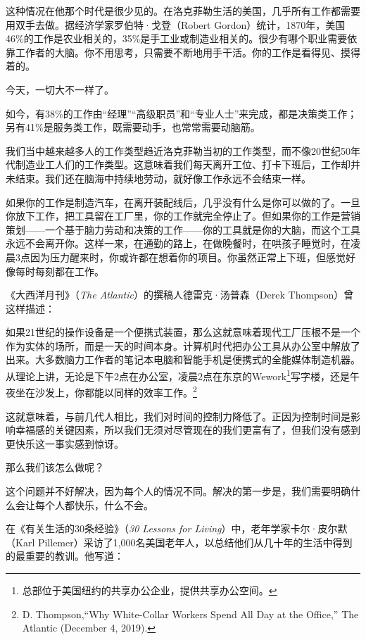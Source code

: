 这种情况在他那个时代是很少见的。在洛克菲勒生活的美国，几乎所有工作都需要用双手去做。据经济学家罗伯特·戈登（Robert Gordon）统计，1870年，美国46\%的工作是农业相关的，35\%是手工业或制造业相关的。很少有哪个职业需要依靠工作者的大脑。你不用思考，只需要不断地用手干活。你的工作是看得见、摸得着的。

今天，一切大不一样了。

如今，有38\%的工作由“经理”“高级职员”和“专业人士”来完成，都是决策类工作；另有41\%是服务类工作，既需要动手，也常常需要动脑筋。

我们当中越来越多人的工作类型趋近洛克菲勒当初的工作类型，而不像20世纪50年代制造业工人们的工作类型。这意味着我们每天离开工位、打卡下班后，工作却并未结束。我们还在脑海中持续地劳动，就好像工作永远不会结束一样。

如果你的工作是制造汽车，在离开装配线后，几乎没有什么是你可以做的了。一旦你放下工作，把工具留在工厂里，你的工作就完全停止了。但如果你的工作是营销策划——一个基于脑力劳动和决策的工作——你的工具就是你的大脑，而这个工具永远不会离开你。这样一来，在通勤的路上，在做晚餐时，在哄孩子睡觉时，在凌晨3点因为压力醒来时，你或许都在想着你的项目。你虽然正常上下班，但感觉好像每时每刻都在工作。

《大西洋月刊》（\textit{The Atlantic}）的撰稿人德雷克·汤普森（Derek Thompson）曾这样描述：

{\kaishu

如果21世纪的操作设备是一个便携式装置，那么这就意味着现代工厂压根不是一个作为实体的场所，而是一天的时间本身。计算机时代把办公工具从办公室中解放了出来。大多数脑力工作者的笔记本电脑和智能手机是便携式的全能媒体制造机器。从理论上讲，无论是下午2点在办公室，凌晨2点在东京的Wework\footnote{总部位于美国纽约的共享办公企业，提供共享办公空间。}写字楼，还是午夜坐在沙发上，你都能以同样的效率工作。\footnote{D. Thompson,“Why White-Collar Workers Spend All Day at the Office,” The Atlantic (December 4, 2019).}

}

这就意味着，与前几代人相比，我们对时间的控制力降低了。正因为控制时间是影响幸福感的关键因素，所以我们无须对尽管现在的我们更富有了，但我们没有感到更快乐这一事实感到惊讶。

那么我们该怎么做呢？

这个问题并不好解决，因为每个人的情况不同。解决的第一步是，我们需要明确什么会让每个人都快乐，什么不会。

在《有关生活的30条经验》（\textit{30 Lessons for Living}）中，老年学家卡尔·皮尔默（Karl Pillemer）采访了1,000名美国老年人，以总结他们从几十年的生活中得到的最重要的教训。他写道：

